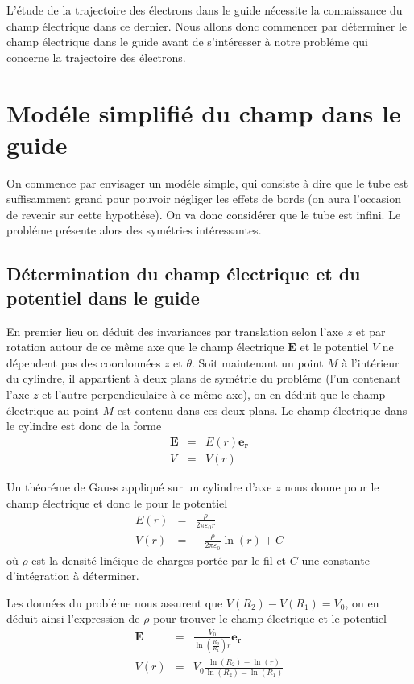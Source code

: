 \documentclass[a4paper,12pt]{article}
\begin{document}
L'étude de la trajectoire des électrons dans le guide nécessite la connaissance du champ électrique dans ce dernier. Nous allons donc commencer par déterminer le champ électrique dans le guide avant de s'intéresser à notre probléme qui concerne la trajectoire des électrons.

\section{Modéle simplifié du champ dans le guide}


On commence par envisager un modéle simple, qui consiste à dire que le tube est suffisamment grand pour pouvoir négliger les effets de bords (on aura l'occasion de revenir sur cette hypothése). On va donc considérer que le tube est infini. Le probléme présente alors des symétries intéressantes.


\subsection{Détermination du champ électrique et du potentiel dans le guide}

En premier lieu on déduit des invariances par translation selon l'axe $z$ et par rotation autour de ce même axe que le champ électrique $\mathbf{E}$ et le potentiel $V$ ne dépendent pas des coordonnées $z$ et $\theta$. Soit maintenant un point $M$ à l'intérieur du cylindre, il appartient à deux plans de symétrie du probléme (l'un contenant l'axe $z$ et l'autre perpendiculaire à ce même axe), on en déduit que le champ électrique au point $M$ est contenu dans ces deux plans. Le champ électrique dans le cylindre est donc de la forme
\begin{eqnarray}
\mathbf{E} &=& E(r) \mathbf{e_r}\\
V &=& V(r)
\end{eqnarray}

Un théoréme de Gauss appliqué sur un cylindre d'axe $z$ nous donne pour le champ électrique et donc le pour le potentiel
\begin{eqnarray}
E(r) &=& \frac{\rho}{2 \pi \varepsilon_0 r}\\
V(r) &= &-\frac{\rho}{2 \pi \varepsilon_0} \ln(r) + C
\end{eqnarray}
où $\rho$ est la densité linéique de charges portée par le fil et $C$ une constante d'intégration à déterminer.

Les données du probléme nous assurent que $V(R_2) - V(R_1) = V_0$, on en déduit ainsi l'expression de $\rho$ pour trouver le champ électrique et le potentiel
\begin{eqnarray}
\mathbf{E} &=& \frac{V_0}{\ln(\frac{R_2}{R_1})r} \mathbf{e_r}\\
V(r) &=& V_0 \frac{\ln(R_2) - \ln(r)}{\ln(R_2) - \ln(R_1)} 
\end{eqnarray}
\end{document}
